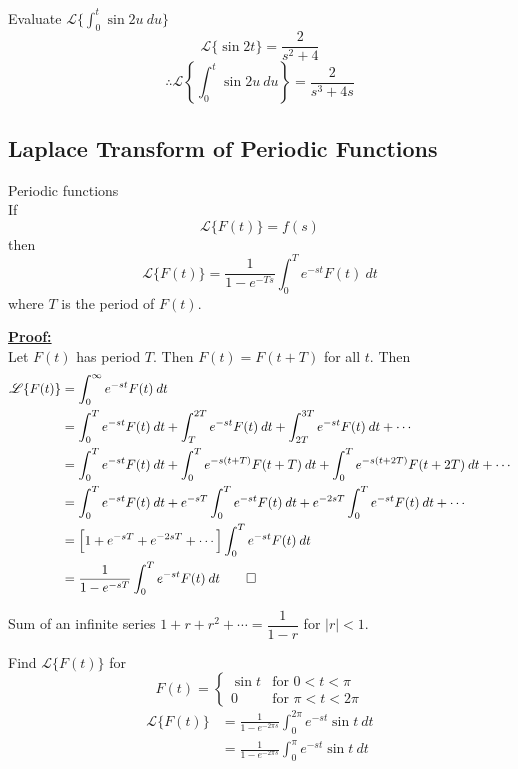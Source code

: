 \documentclass[12pt]{article}
\newcommand{\Lap}{\mathscr{L}}
\begin{document}
\begin{example}{Evaluate $\Lap \{ \int_{0}^{t} {\sin{2u}} \: d{u} \}$}{}
    \[ \Lap \{ \sin{2t} \} = \frac{2}{s^2+4} \]
    \[ \therefore \Lap \left\{ \int_{0}^{t} {\sin{2u}} \: d{u} \right\} = \frac{2}{s^3 + 4s} \]
\end{example}

\subsection{Laplace Transform of Periodic Functions}
\begin{theorem}{Periodic functions}{}
    \\If \[
        \Lap \{ F(t) \} = f(s)
    \] then \[
        \Lap \{ F(t) \} = \frac{1}{1-e^{-Ts}} \int_{0}^{T} {e^{-st}F(t)} \: d{t}
    \] where $T$ is the period of $F(t)$.
\end{theorem}

\underline{\textbf{Proof: }} \\
Let $F(t)$ has period $T$. Then $F(t) = F(t+T)$ for all $t$. Then
\begin{align*}
    \Lap \{ F(t) \} &= \int_{0}^{\infty} {e^{-st}F(t)} \: d{t} \\
    &= \int_{0}^{T} {e^{-st}F(t)} \: d{t} + \int_{T}^{2T} {e^{-st}F(t)} \: d{t} + \int_{2T}^{3T} {e^{-st}F(t)} \: d{t} + \cdots \\
    &= \int_{0}^{T} {e^{-st}F(t)} \: d{t} + \int_{0}^{T} {e^{-s(t+T)}F(t+T)} \: d{t} + \int_{0}^{T} {e^{-s(t+2T)}F(t+2T)} \: d{t} + \cdots \\
    &= \int_{0}^{T} {e^{-st}F(t)} \: d{t} + e^{-sT} \int_{0}^{T} {e^{-st}F(t)} \: d{t} + e^{-2sT} \int_{0}^{T} {e^{-st}F(t)} \: d{t} + \cdots \\
    &= \left[ 1 + e^{-sT} + e^{-2sT} + \cdots \right] \int_{0}^{T} {e^{-st}F(t)} \: d{t} \\
    &= \frac{1}{1-e^{-sT}} \int_{0}^{T} {e^{-st}F(t)} \: d{t} \qed
\end{align*}
\begin{note}{}
    Sum of an infinite series $1 + r + r^2 + \cdots = \dfrac{1}{1-r}$ for $|r|<1$.
\end{note}

\begin{example}{
        Find $\Lap \{ F(t) \}$ for \[
            F(t) = 
            \begin{cases}
                \sin{t} & \text{for } 0 < t < \pi \\
                0 & \text{for } \pi < t < 2\pi
            \end{cases}
        \]
    }{}
    \begin{align*}
        \Lap \{ F(t) \} &= \frac{1}{1 - e^{-2\pi s}} \int_{0}^{2\pi} { e^{-st} \sin{t} } \: d{t} \\
        &= \frac{1}{1-e^{-2\pi s}} \int_{0}^{\pi} {e^{-st} \sin{t}} \: d{t}
    \end{align*}
\end{example}
\end{document}
